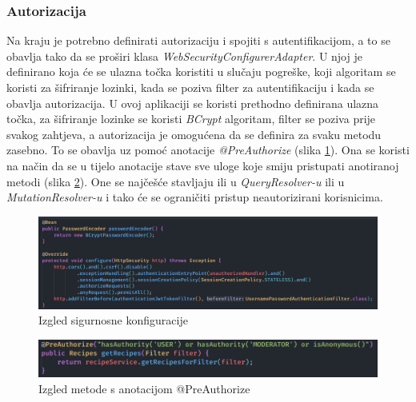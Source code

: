 \documentclass[times, utf8, zavrsni]{fer}
\begin{document}
\subsubsection{Autorizacija}
Na kraju je potrebno definirati autorizaciju i spojiti s autentifikacijom, a to se obavlja tako da se
proširi klasa \textit{WebSecurityConfigurerAdapter}.
U njoj je definirano koja će se ulazna točka koristiti u slučaju pogreške, koji algoritam se koristi za šifriranje lozinki,
kada se poziva filter za autentifikaciju i kada se obavlja autorizacija. U ovoj aplikaciji se koristi prethodno
definirana ulazna točka, za šifriranje lozinke se koristi \textit{BCrypt} algoritam, filter se poziva prije svakog zahtjeva, a
autorizacija je omogućena da se definira za svaku metodu zasebno. To se obavlja
uz pomoć anotacije \textit{@PreAuthorize} (slika \ref{fig:WebSecurityConfig}).
Ona se koristi na način da se u tijelo anotacije stave sve uloge koje smiju pristupati anotiranoj metodi (slika \ref{fig:PreAuthorize}).
One se najčešće stavljaju ili u \textit{QueryResolver-u} ili u \textit{MutationResolver-u} i tako će se ograničiti pristup
neautorizirani korisnicima.
\begin{figure}[h]
      \centering
      \includegraphics[width=\textwidth]{WebSecurityConfig.png}
      \caption{Izgled sigurnosne konfiguracije}
      \label{fig:WebSecurityConfig}
\end{figure}
\begin{figure}[h]
      \centering
      \includegraphics[width=\textwidth]{PreAuthorize.png}
      \caption{Izgled metode s anotacijom @PreAuthorize}
      \label{fig:PreAuthorize}
\end{figure}
\newpage
\end{document}
